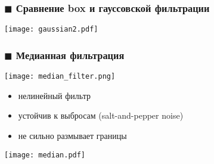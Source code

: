 \documentclass[
    12pt, 
    usepdftitle=false,
    aspectratio=1610
]{beamer}
\begin{document}
\begin{frame}
    \frametitle{$\blacksquare$ Сравнение box и гауссовской фильтрации}
    \begin{center} 
        \texttt{[image: gaussian2.pdf]}
    \end{center}
\end{frame}

\begin{frame}
    \frametitle{$\blacksquare$ Медианная фильтрация}
    \begin{center}
        \texttt{[image: median\_filter.png]}
    \end{center}
    \begin{itemize}
        \item нелинейный фильтр
        \item устойчив к выбросам (salt-and-pepper noise)
        \item не сильно размывает границы
    \end{itemize}
    \begin{center}
        \texttt{[image: median.pdf]}
    \end{center}
\end{frame}


\end{document}
